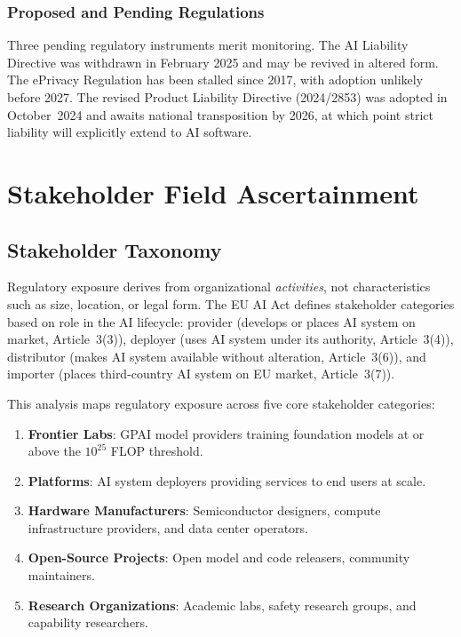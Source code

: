 \documentclass[11pt,a4paper]{article}
\begin{document}
\subsubsection{Proposed and Pending Regulations}

Three pending regulatory instruments merit monitoring. The AI Liability Directive was withdrawn in February 2025 and may be revived in altered form. The ePrivacy Regulation has been stalled since 2017, with adoption unlikely before 2027. The revised Product Liability Directive (2024/2853) was adopted in October~2024 and awaits national transposition by 2026, at which point strict liability will explicitly extend to AI software.


\section{Stakeholder Field Ascertainment}
\label{sec:stakeholders}

\subsection{Stakeholder Taxonomy}

Regulatory exposure derives from organizational \emph{activities}, not characteristics such as size, location, or legal form. The EU AI Act defines stakeholder categories based on role in the AI lifecycle: provider (develops or places AI system on market, Article~3(3)), deployer (uses AI system under its authority, Article~3(4)), distributor (makes AI system available without alteration, Article~3(6)), and importer (places third-country AI system on EU market, Article~3(7)).

This analysis maps regulatory exposure across five core stakeholder categories:

\begin{enumerate}
  \item \textbf{Frontier Labs}: GPAI model providers training foundation models at or above the $10^{25}$ FLOP threshold.
  \item \textbf{Platforms}: AI system deployers providing services to end users at scale.
  \item \textbf{Hardware Manufacturers}: Semiconductor designers, compute infrastructure providers, and data center operators.
  \item \textbf{Open-Source Projects}: Open model and code releasers, community maintainers.
  \item \textbf{Research Organizations}: Academic labs, safety research groups, and capability researchers.
\end{enumerate}
\end{document}
